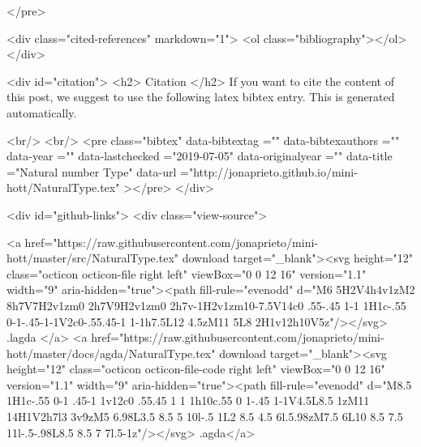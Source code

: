 </pre>


  <div class="cited-references" markdown="1">
  <ol class="bibliography"></ol>
  </div>


  
  <div id="citation">
  <h2> Citation </h2>
  If you want to cite the content of this post,
  we suggest to use the following latex bibtex entry.
  This is generated automatically.

  <br/>
  <br/>
  <pre class="bibtex"
       data-bibtextag =""
       data-bibtexauthors =""
       data-year =""
       data-lastchecked ="2019-07-05"
       data-originalyear =""
       data-title ="Natural number Type"
       data-url ="http://jonaprieto.github.io/mini-hott/NaturalType.tex"
  ></pre>
  </div>
  

  <div id="github-links">
    <div class="view-source">
      
        <a href="https://raw.githubusercontent.com/jonaprieto/mini-hott/master/src/NaturalType.tex" download target="_blank"><svg height="12" class="octicon octicon-file right left" viewBox="0 0 12 16" version="1.1" width="9" aria-hidden="true"><path fill-rule="evenodd" d="M6 5H2V4h4v1zM2 8h7V7H2v1zm0 2h7V9H2v1zm0 2h7v-1H2v1zm10-7.5V14c0 .55-.45 1-1 1H1c-.55 0-1-.45-1-1V2c0-.55.45-1 1-1h7.5L12 4.5zM11 5L8 2H1v12h10V5z"/></svg> .lagda </a>
        <a href="https://raw.githubusercontent.com/jonaprieto/mini-hott/master/docs/agda/NaturalType.tex" download target="_blank"><svg height="12" class="octicon octicon-file-code right left" viewBox="0 0 12 16" version="1.1" width="9" aria-hidden="true"><path fill-rule="evenodd" d="M8.5 1H1c-.55 0-1 .45-1 1v12c0 .55.45 1 1 1h10c.55 0 1-.45 1-1V4.5L8.5 1zM11 14H1V2h7l3 3v9zM5 6.98L3.5 8.5 5 10l-.5 1L2 8.5 4.5 6l.5.98zM7.5 6L10 8.5 7.5 11l-.5-.98L8.5 8.5 7 7l.5-1z"/></svg> .agda</a>
      
